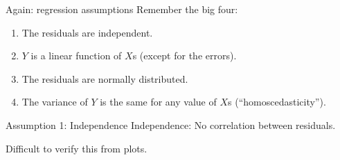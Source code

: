 \documentclass{beamer}\usepackage[]{graphicx}\usepackage[]{color}
\makeatletter
\newcommand{\hlopt}[1]{\textcolor[rgb]{1,0.894,0.769}{#1}}%
\newcommand{\hlstd}[1]{\textcolor[rgb]{1,0.894,0.769}{#1}}%
\newcommand{\hlkwd}[1]{\textcolor[rgb]{1,0.78,0.769}{#1}}%
\newenvironment{kframe}{%
 \def\at@end@of@kframe{}%
 \ifinner\ifhmode%
  \def\at@end@of@kframe{\end{minipage}}%
  \begin{minipage}{\columnwidth}%
 \fi\fi%
 \def\FrameCommand##1{\hskip\@totalleftmargin \hskip-\fboxsep
 \colorbox{shadecolor}{##1}\hskip-\fboxsep
     \hskip-\linewidth \hskip-\@totalleftmargin \hskip\columnwidth}%
 \MakeFramed {\advance\hsize-\width
   \@totalleftmargin\z@ \linewidth\hsize
   \@setminipage}}%
 {\par\unskip\endMakeFramed%
 \at@end@of@kframe}
\newenvironment{knitrout}{}{} %
\makeatother
\begin{document}
\begin{darkframes}
    
    
    
    \begin{frame}{Again: regression assumptions}
    \fontsize{9}{9}\selectfont
      Remember the big four:
      \begin{enumerate}
        \item \alert{The residuals are independent.}
        \item $Y$ is a linear function of $X$s (except for the errors).
        \item The residuals are normally distributed.
        \item The variance of $Y$ is the same for any value of $X$s (``homoscedasticity'').
    
      \end{enumerate}
    \end{frame}
    
    
    \begin{frame}[fragile]{Assumption 1: Independence}
    \fontsize{9}{9}\selectfont
      Independence: No correlation between residuals. \pause
    
      Difficult to verify this from plots.
      
    \end{frame}
    

    
    

\end{darkframes}
\end{document}
